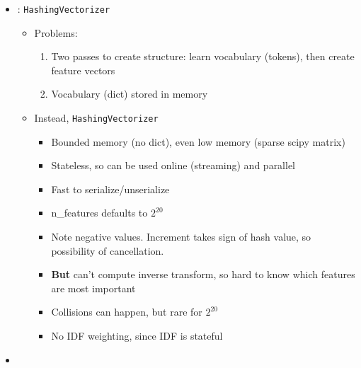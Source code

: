 \begin{itemize}
\begin{itemize}
  \end{itemize}
\item {}: \texttt{HashingVectorizer}
  \begin{itemize}
  \item Problems:
    \begin{enumerate}
    \item Two passes to create structure: learn vocabulary (tokens), then create feature vectors
    \item Vocabulary (dict) stored in memory
    \end{enumerate}
  \item Instead, \texttt{HashingVectorizer}
    \begin{itemize}
    \item Bounded memory (no dict), even low memory (sparse scipy matrix)
    \item Stateless, so can be used online (streaming) and parallel
    \item Fast to serialize/unserialize
    \item n\_features defaults to $2^{20}$
    \item Note negative values.  Increment takes sign of hash value, so possibility of cancellation.
    \item \textbf{But} can't compute inverse transform, so hard to know which features are most important
    \item Collisions can happen, but rare for $2^{20}$
    \item No IDF weighting, since IDF is stateful
    \end{itemize}
  \end{itemize}



\item 
\end{itemize}


